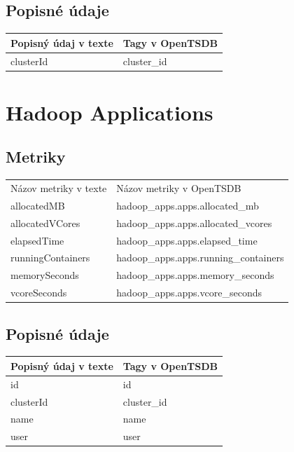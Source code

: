 \documentclass[printed,11pt,twoside,color,cover,table]{fithesis3}
\begin{document}
\subsection{Popisné údaje}
\begin{center}
    \begin{tabular}{| l | l |}
    \hline
    Popisný údaj v texte & Tagy v OpenTSDB \\ \hline
    clusterId & cluster\_id\\ \hline
    \end{tabular}
\end{center}


\section{Hadoop Applications}
\subsection{Metriky}
\begin{center}
    \begin{tabular}{| l | l |}
    \hline
    Názov metriky v texte & Názov metriky v OpenTSDB\\
	allocatedMB & hadoop\_apps.apps.allocated\_mb\\ \hline
    allocatedVCores & hadoop\_apps.apps.allocated\_vcores\\ \hline
    elapsedTime & hadoop\_apps.apps.elapsed\_time\\ \hline
    runningContainers & hadoop\_apps.apps.running\_containers\\ \hline 
    memorySeconds & hadoop\_apps.apps.memory\_seconds\\ \hline
    vcoreSeconds & hadoop\_apps.apps.vcore\_seconds\\ \hline
    \end{tabular}
\end{center}

\subsection{Popisné údaje}
\begin{center}
    \begin{tabular}{| l | l |}
    \hline
    Popisný údaj v texte & Tagy v OpenTSDB \\ \hline
    id & id\\ \hline
    clusterId & cluster\_id\\ \hline
    name & name\\ \hline
    user & user\\ \hline
    \end{tabular}
\end{center}
\end{document}
